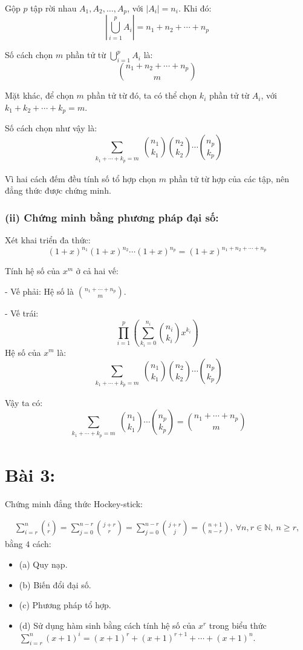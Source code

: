 \documentclass{article}
\begin{document}
	Gộp $p$ tập rời nhau $A_1, A_2, \ldots, A_p$, với $|A_i| = n_i$. Khi đó:
	\[
	\left| \bigcup_{i=1}^p A_i \right| = n_1 + n_2 + \cdots + n_p
	\]
	
	Số cách chọn $m$ phần tử từ $\bigcup_{i=1}^p A_i$ là:
	\[
	\binom{n_1 + n_2 + \cdots + n_p}{m}
	\]
	
	Mặt khác, để chọn $m$ phần tử từ đó, ta có thể chọn $k_i$ phần tử từ $A_i$, với $k_1 + k_2 + \cdots + k_p = m$.
	
	Số cách chọn như vậy là:
	\[
	\sum_{\substack{k_1 + \cdots + k_p = m}} \binom{n_1}{k_1} \binom{n_2}{k_2} \cdots \binom{n_p}{k_p}
	\]
	
	Vì hai cách đếm đều tính số tổ hợp chọn $m$ phần tử từ hợp của các tập, nên đẳng thức được chứng minh.
	
	\subsubsection*{(ii) Chứng minh bằng phương pháp đại số:}
	
	Xét khai triển đa thức:
	\[
	(1 + x)^{n_1} (1 + x)^{n_2} \cdots (1 + x)^{n_p} = (1 + x)^{n_1 + n_2 + \cdots + n_p}
	\]
	
	Tính hệ số của $x^m$ ở cả hai vế:
	
	- Vế phải: Hệ số là $\binom{n_1 + \cdots + n_p}{m}$.
	
	- Vế trái:
	\[
	\prod_{i=1}^{p} \left( \sum_{k_i=0}^{n_i} \binom{n_i}{k_i} x^{k_i} \right)
	\]
	Hệ số của $x^m$ là:
	\[
	\sum_{\substack{k_1 + \cdots + k_p = m}} \binom{n_1}{k_1} \binom{n_2}{k_2} \cdots \binom{n_p}{k_p}
	\]
	
	Vậy ta có:
	\[
	\sum_{\substack{k_1 + \cdots + k_p = m}} \binom{n_1}{k_1} \cdots \binom{n_p}{k_p}
	= \binom{n_1 + \cdots + n_p}{m}
	\]
		
	\section*{Bài 3:}
	
	Chứng minh đẳng thức Hockey-stick:
	
	\begin{align*}
		\sum_{i=r}^n \binom{i}{r} = \sum_{j=0}^{n - r} \binom{j + r}{r} = \sum_{j=0}^{n - r} \binom{j + r}{j} = \binom{n + 1}{n - r},\ \forall n,r\in\mathbb{N},\ n\ge r,
	\end{align*}
	bằng $4$ cách: 
	
	\begin{itemize}
		\item (a) Quy nạp.
		\item (b) Biến đổi đại số.
		\item (c) Phương pháp tổ hợp.
		\item (d) Sử dụng hàm sinh bằng cách tính hệ số của $x^r$ trong biểu thức $\sum_{i=r}^n (x + 1)^i = (x + 1)^r + (x + 1)^{r + 1} + \cdots + (x + 1)^n$.
	\end{itemize}
	   
\end{document}
